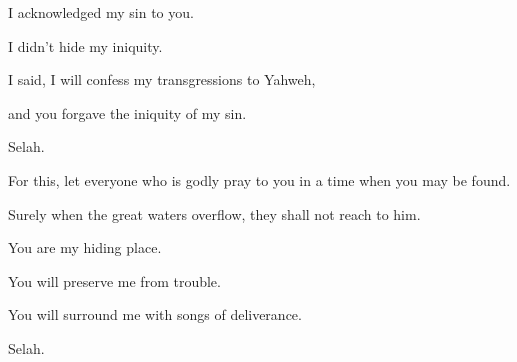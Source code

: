 {\par }
{\Q {}I acknowledged my sin to you.
\par }{\QB I didn’t hide my iniquity.
\par }{\Q I said, I will confess my transgressions to Yahweh,
\par }{\QB and you forgave the iniquity of my sin.
\par }{\QS Selah.\par }
{\Q {}For this, let everyone who is godly pray to you in a time when you may be found.
\par }{\QB Surely when the great waters overflow, they shall not reach to him.
\par }{\Q {}You are my hiding place.
\par }{\QB You will preserve me from trouble.
\par }{\QB You will surround me with songs of deliverance.
\par }{\QS Selah.\par }
